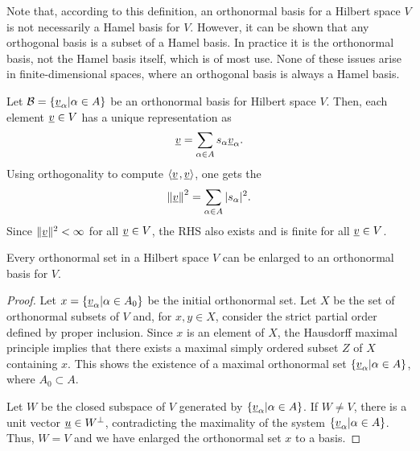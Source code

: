 Note that, according to this definition, an orthonormal basis for a Hilbert space $V$ is not necessarily a Hamel basis for $V$.
However, it can be shown that any orthogonal basis is a subset of a Hamel basis.
In practice it is the orthonormal basis, not the Hamel basis itself, which is of most use.
None of these issues arise in finite-dimensional spaces, where an orthogonal basis is always a Hamel basis.

Let $\mathcal{B} = \left\{ \underline{v}_{\alpha} | \alpha \in A \right\}$ be an orthonormal basis for Hilbert space $V$.
Then, each element $\underline{v} \in V$ has a unique representation as
\begin{equation*}
\underline{v} = \sum_{\alpha \in A} s_{\alpha} \underline{v}_{\alpha}.
\end{equation*}
Using orthogonality to compute ${\left\langle  \underline{v}  \mskip2mu ,  \underline{v}  \right\rangle}$, one gets the 
\begin{equation*}
\left\| \underline{v} \right\|^2 = \sum_{\alpha \in A} | s_{\alpha} |^2.
\end{equation*}
Since $\| \underline{v} \|^2 < \infty$ for all $\underline{v} \in V$, the RHS also exists and is finite for all $\underline{v} \in V$.

\begin{theorem}
Every orthonormal set in a Hilbert space $V$ can be enlarged to an orthonormal basis for $V$.
\end{theorem}
\begin{proof}
Let $x = \left\{ \underline{v}_{\alpha} | \alpha \in A_0 \right\}$ be the initial orthonormal set.
Let $X$ be the set of orthonormal subsets of $V$ and, for $x, y \in X$, consider the strict partial order defined by proper inclusion.
Since $x$ is an element of $X$, the Hausdorff maximal principle implies that there exists a maximal simply ordered subset $Z$ of $X$ containing $x$.
This shows the existence of a maximal orthonormal set $\left\{ \underline{v}_{\alpha} | \alpha \in A \right\}$, where $A_0 \subset A$.

Let $W$ be the closed subspace of $V$ generated by $\left\{ \underline{v}_{\alpha} | \alpha \in A \right\}$.
If $W \neq V$, there is a unit vector $\underline{u} \in W^{\bot}$, contradicting the maximality of the system $\left\{ \underline{v}_{\alpha} | \alpha \in A \right\}$.
Thus, $W = V$ and we have enlarged the orthonormal set $x$ to a basis.
\end{proof}


